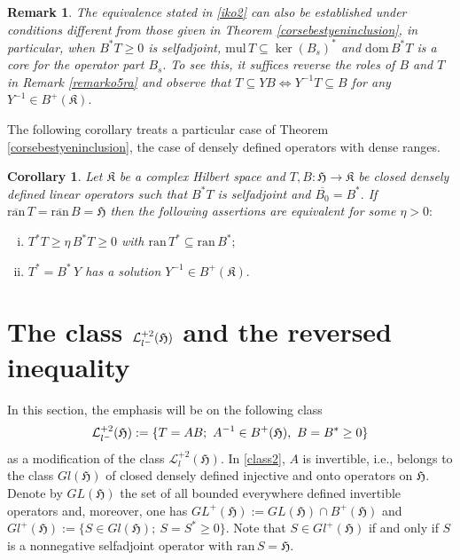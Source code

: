 \documentclass{amsart}
\newtheorem{corollary}[theorem]{Corollary}
\newtheorem{remark}[theorem]{Remark}
\newcommand{\ifaf}{\Leftrightarrow}
\newcommand{\h}{\mathfrak{H}}
\newcommand{\kk}{\mathfrak{K}}
\newcommand{\mul}{\mathrm{mul} \, }
\newcommand{\ran}{\mathrm{ran}\,}
\newcommand{\ranbar}{\overline{\mathrm{ran}}\,}
\newcommand{\D}{\mathrm{dom}\,}
\newcommand{\adj}{^*}
\newcommand{\inv}{^{-1}}
\newcommand{\tstar}{T^{*}}
\newcommand{\inclu}{\subseteq}
\newcommand{\lplusk}{B^{+}(\kk)}
\newcommand{\lplus}{B^{+}(\h)}
\newcommand{\gplus}{GL^{+}(\h)}
\newcommand{\ldeux}{\mathcal{L}_l^{+2}(\h)}
\newcommand{\lldeux}{\mathcal{L}_{{l}^{\tiny-}}^{+2}(\h)}
\numberwithin{equation}{section}
\renewcommand{\labelenumi}{(\arabic{enumi})}
\begin{document}
\begin{remark}\normalfont
The equivalence stated in  \eqref{iko2} can also be established    under conditions different  from those given in Theorem  \ref{corsebestyeninclusion}, in particular, when  $B\adj T \geq 0$ is selfadjoint,  $\mul T \inclu \ker (B_s)\adj$ and  $\D B\adj T$ is a core for the operator part $B_s. $
To see this, it suffices reverse the roles of $B$ and $T$ in Remark \ref{remarko5ra} and observe that $ T \inclu YB \ifaf Y\inv T \inclu B$ for any $Y \inv \in \lplusk.$
\end{remark}

The following corollary treats  a  particular case of Theorem  \ref{corsebestyeninclusion}, the case of densely defined operators with dense ranges.

\begin{corollary}\label{inversesebestyen}
Let $\kk$ be a complex Hilbert space and $T,B:\h \rightarrow \kk$ be closed densely defined linear operators    such that    $B\adj T$ is selfadjoint and $\overline{B_0}=B\adj .$
If $\ranbar T = \ranbar B=\h $  then the following assertions are equivalent for some $\eta > 0:$
\begin{enumerate}[(i)]\def\labelenumi{\rm(\roman{enumi})}
   \item  $T^* T  \geq \eta \, B\adj T \geq 0 $ with  $\ran{\tstar} \inclu    \ran B\adj;$
   \item $ \tstar =   B\adj \, Y $ has a solution $Y\inv \in \lplusk.$
\end{enumerate}
\end{corollary}


\section{The class $\lldeux$ and the  reversed   inequality} \label{section04}

  In this section, the emphasis will be on the following class
  \begin{equation} \label{class2}
    \lldeux:=\{ T=AB ; \ A\inv \in \lplus,\ B= B\adj \geq 0 \}
  \end{equation}
as a modification of the class $\ldeux.$ In \eqref{class2},  $A$ is invertible, i.e., belongs to the class   $Gl(\h)$ of closed densely defined  injective and onto  operators on $\h.$ Denote by     $GL(\h)$  the set of all bounded everywhere defined invertible operators and, moreover, one      has $\gplus:= GL(\h) \cap \lplus$ and   $Gl^+(\h):=\{ S \in Gl(\h); \ S= S\adj \geq 0\}.$ Note that $ S \in Gl^+(\h)$ if and only if $S$ is a nonnegative selfadjoint operator with $\ran S= \h.$
\end{document}
